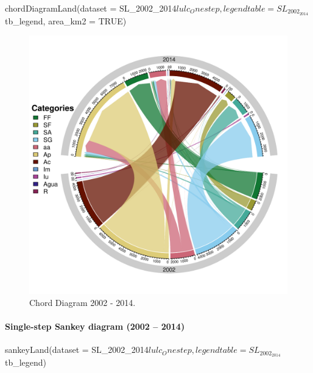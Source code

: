 \begin{Schunk}
\begin{Sinput}
chordDiagramLand(dataset = SL_2002_2014$lulc_Onestep,
                 legendtable = SL_2002_2014$tb_legend,
                 area_km2 = TRUE)
\end{Sinput}
\begin{figure}[h]

{\centering \includegraphics[width=0.80\linewidth,trim={0 1.40cm 0 1.40cm},clip]{figures/chordDiagram.pdf} 

}

\caption[Chord Diagram 2002 - 2014]{Chord Diagram 2002 - 2014.}\label{fig:chordDiagram}
\end{figure}
\end{Schunk}
\newpage
\hypertarget{single-step-sankey-diagram-2002-2014}{%
\paragraph{Single-step Sankey diagram (2002 --
2014)}\label{single-step-sankey-diagram-2002-2014}}

\begin{Schunk}
\begin{Sinput}
sankeyLand(dataset = SL_2002_2014$lulc_Onestep,
           legendtable = SL_2002_2014$tb_legend)
\end{Sinput}
\end{Schunk}

